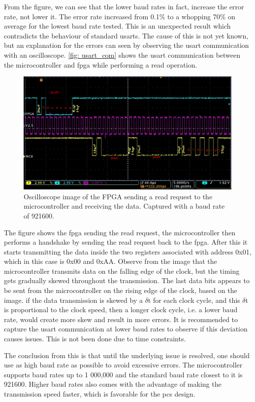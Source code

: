\documentclass[main.tex]{subfiles}
\begin{document}
From the figure, we can see that the lower baud rates in fact, increase the error rate, not lower it. The error rate increased from 0.1\% to a whopping 70\% on average for the lowest baud rate tested. This is an unexpected result which contradicts the behaviour of standard \gls{usart}s. The cause of this is not yet known, but an explanation for the errors can seen by observing the \gls{usart} communication with an oscilloscope. \autoref{fig: usart_com} shows the \gls{usart} communication between the microcontroller and \gls{fpga} while performing a read operation.

\begin{figure}[!ht]
    \centering
    \includegraphics[width=18cm]{images/USARTTransaction.png}
    \caption{Oscilloscope image of the FPGA sending a read request to the microcontroller and receiving the data. Captured with a baud rate of 921600.}
    \label{fig: usart_com}
\end{figure}
\FloatBarrier

The figure shows the \gls{fpga} sending the read request, the microcontroller then performs a handshake by sending the read request back to the \gls{fpga}. After this it starts transmitting the data inside the two registers associated with address 0x01, which in this case is 0x00 and 0xAA. Observe from the image that the microcontroller transmits data on the falling edge of the clock, but the timing gets gradually skewed throughout the transmission. The last data bits appears to be sent from the microcontroller on the rising edge of the clock, based on the image. if the data transmission is skewed by a $\delta$t for each clock cycle, and this $\delta$t is proportional to the clock speed, then a longer clock cycle, i.e. a lower baud rate, would create more skew and result in more errors. It is recommended to capture the \gls{usart} communication at lower baud rates to observe if this deviation causes issues. This is not been done due to time constraints.

The conclusion from this is that until the underlying issue is resolved, one should use as high baud rate as possible to avoid excessive errors. The microcontroller supports baud rates up to 1 000,000 and the standard baud rate closest to it is 921600. Higher baud rates also comes with the advantage of making the transmission speed faster, which is favorable for the \gls{pcs} design.
\end{document}
